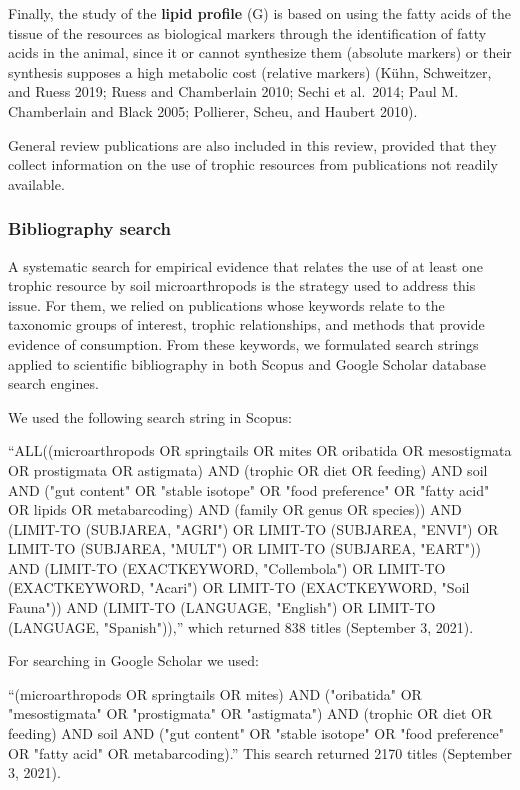 \documentclass[11pt]{article}
\begin{document}
Finally, the study of the \textbf{lipid profile} (G) is based on using
the fatty acids of the tissue of the resources as biological markers
through the identification of fatty acids in the animal, since it or
cannot synthesize them (absolute markers) or their synthesis supposes a
high metabolic cost (relative markers) (Kühn, Schweitzer, and Ruess
2019; Ruess and Chamberlain 2010; Sechi et al.~2014; Paul M. Chamberlain
and Black 2005; Pollierer, Scheu, and Haubert 2010).

General review publications are also included in this review, provided
that they collect information on the use of trophic resources from
publications not readily available.

\hypertarget{bibliography-search}{%
\subsubsection{Bibliography search}\label{bibliography-search}}

A systematic search for empirical evidence that relates the use of at
least one trophic resource by soil microarthropods is the strategy used
to address this issue. For them, we relied on publications whose
keywords relate to the taxonomic groups of interest, trophic
relationships, and methods that provide evidence of consumption. From
these keywords, we formulated search strings applied to scientific
bibliography in both Scopus and Google Scholar database search engines.

We used the following search string in Scopus:

``ALL((microarthropods OR springtails OR mites OR oribatida OR
mesostigmata OR prostigmata OR astigmata) AND (trophic OR diet OR
feeding) AND soil AND ("gut content" OR "stable isotope" OR "food
preference" OR "fatty acid" OR lipids OR metabarcoding) AND (family OR
genus OR species)) AND (LIMIT-TO (SUBJAREA, "AGRI") OR LIMIT-TO
(SUBJAREA, "ENVI") OR LIMIT-TO (SUBJAREA, "MULT") OR LIMIT-TO (SUBJAREA,
"EART")) AND (LIMIT-TO (EXACTKEYWORD, "Collembola") OR LIMIT-TO
(EXACTKEYWORD, "Acari") OR LIMIT-TO (EXACTKEYWORD, "Soil Fauna")) AND
(LIMIT-TO (LANGUAGE, "English") OR LIMIT-TO (LANGUAGE, "Spanish")),''
which returned 838 titles (September 3, 2021).

For searching in Google Scholar we used:

``(microarthropods OR springtails OR mites) AND ("oribatida" OR
"mesostigmata" OR "prostigmata" OR "astigmata") AND (trophic OR diet OR
feeding) AND soil AND ("gut content" OR "stable isotope" OR "food
preference" OR "fatty acid" OR metabarcoding).'' This search returned
2170 titles (September 3, 2021).
\end{document}
